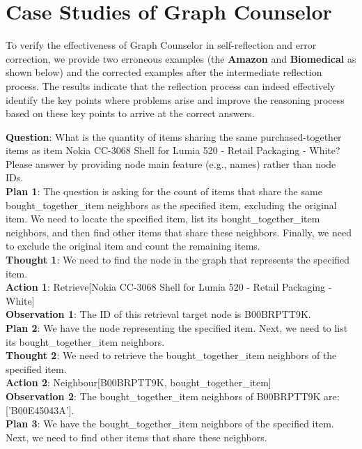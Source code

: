 \documentclass[11pt]{article}
\begin{document}
\section{Case Studies of Graph Counselor}
To verify the effectiveness of Graph Counselor in self-reflection and error correction, we provide two erroneous examples (the \textbf{Amazon} and \textbf{Biomedical} as shown below) and the corrected examples after the intermediate reflection process. The results indicate that the reflection process can indeed effectively identify the key points where problems arise and improve the reasoning process based on these key points to arrive at the correct answers.
\begin{tcolorbox}[colback=white!10!white, colframe=blue!30!black, title=Wrong Case (Amazon), boxrule=1pt, fontupper={\fontsize{7pt}{9pt}\selectfont}]
\justifying
\noindent
\textbf{Question}: What is the quantity of items sharing the same purchased-together items as item Nokia CC-3068 Shell for Lumia 520 - Retail Packaging - White? Please answer by providing node main feature (e.g., names) rather than node IDs. \\
\textbf{Plan 1}: The question is asking for the count of items that share the same bought\_together\_item neighbors as the specified item, excluding the original item. We need to locate the specified item, list its bought\_together\_item neighbors, and then find other items that share these neighbors. Finally, we need to exclude the original item and count the remaining items.\\
\textbf{Thought 1}: We need to find the node in the graph that represents the specified item.\\
\textbf{Action 1}: Retrieve[Nokia CC-3068 Shell for Lumia 520 - Retail Packaging - White]\\
\textbf{Observation 1}: The ID of this retrieval target node is B00BRPTT9K. \\
\textbf{Plan 2}: We have the node representing the specified item. Next, we need to list its bought\_together\_item neighbors.\\
\textbf{Thought 2}: We need to retrieve the bought\_together\_item neighbors of the specified item.\\
\textbf{Action 2}: Neighbour[B00BRPTT9K, bought\_together\_item]\\
\textbf{Observation 2}: The bought\_together\_item neighbors of B00BRPTT9K are: ['B00E45043A']. \\
\textbf{Plan 3}: We have the bought\_together\_item neighbors of the specified item. Next, we need to find other items that share these neighbors.\\

\end{tcolorbox}
\end{document}
